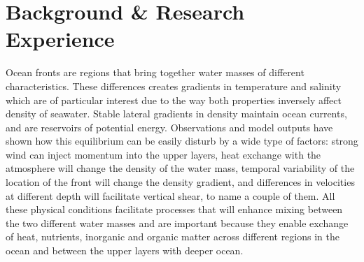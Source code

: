 \documentclass[letterpaper, 12pt ]{article}
\begin{document}
\section*{Background \&  Research Experience}

    

\vspace{10pt}
    Ocean fronts are regions that bring together water masses of different characteristics. These differences creates gradients in temperature and salinity which are of particular interest due to the way both properties inversely affect density of seawater. Stable lateral gradients in density maintain ocean currents, and are reservoirs of potential energy. Observations and model outputs have shown how this equilibrium can be easily disturb by a wide type of factors: strong wind can inject momentum into the upper layers, heat exchange with the atmosphere will change the density of the water mass, temporal variability of the location of the front will change the density gradient, and differences in velocities at different depth will facilitate vertical shear, to name a couple of them. All these physical conditions facilitate processes that will enhance mixing between the two different water masses and are important because they enable exchange of heat, nutrients, inorganic and organic matter across different regions in the ocean and between the upper layers with deeper ocean.
    \vspace{10pt}
    
\end{document}
